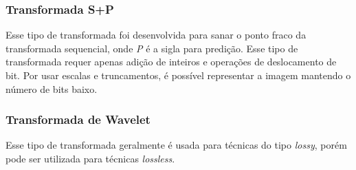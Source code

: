 \subsubsection{Transformada S+P}
\label{sss.sandptransform}

Esse tipo de transformada foi desenvolvida para sanar o ponto fraco da transformada sequencial, onde {\em P} é a sigla para predição. Esse tipo de transformada requer apenas adição de inteiros e operações de deslocamento de bit. Por usar escalas e truncamentos, é possível representar a imagem mantendo o número de bits baixo.

\subsubsection{Transformada de Wavelet}
\label{sss.wavelet}

Esse tipo de transformada geralmente é usada para técnicas do tipo {\em lossy}, porém pode ser utilizada para técnicas {\em lossless}.

